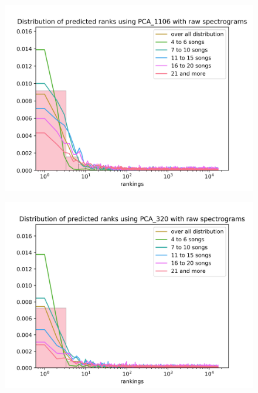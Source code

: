 \begin{figure}[h!]
\centering
\begin{minipage}{.5\textwidth}
  \centering
  \includegraphics[width=1\linewidth]{./img/pca_spec_1106_graph.png}
  \label{fig:pca_spec_1106_distribution}
\end{minipage}%
\begin{minipage}{.5\textwidth}
  \centering
  \includegraphics[width=1\linewidth]{./img/pca_spec_320_graph.png}
  \label{fig:pca_spec_320_distribution}
\end{minipage}
\end{figure}

